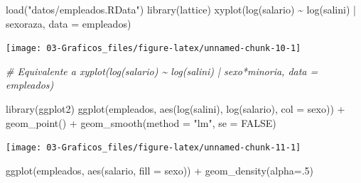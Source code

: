 \documentclass[
]{book}
\newenvironment{Shaded}{\begin{snugshade}}{\end{snugshade}}
\newcommand{\AttributeTok}[1]{\textcolor[rgb]{0.77,0.63,0.00}{#1}}
\newcommand{\CommentTok}[1]{\textcolor[rgb]{0.56,0.35,0.01}{\textit{#1}}}
\newcommand{\ConstantTok}[1]{\textcolor[rgb]{0.00,0.00,0.00}{#1}}
\newcommand{\DecValTok}[1]{\textcolor[rgb]{0.00,0.00,0.81}{#1}}
\newcommand{\FunctionTok}[1]{\textcolor[rgb]{0.00,0.00,0.00}{#1}}
\newcommand{\NormalTok}[1]{#1}
\newcommand{\SpecialCharTok}[1]{\textcolor[rgb]{0.00,0.00,0.00}{#1}}
\newcommand{\StringTok}[1]{\textcolor[rgb]{0.31,0.60,0.02}{#1}}
\theoremstyle{break}
\theoremstyle{nonumberplain}
\begin{document}
\begin{Shaded}
\begin{Highlighting}[]
\FunctionTok{load}\NormalTok{(}\StringTok{"datos/empleados.RData"}\NormalTok{)}
\FunctionTok{library}\NormalTok{(lattice)}
\FunctionTok{xyplot}\NormalTok{(}\FunctionTok{log}\NormalTok{(salario) }\SpecialCharTok{\textasciitilde{}} \FunctionTok{log}\NormalTok{(salini) }\SpecialCharTok{|}\NormalTok{ sexoraza, }\AttributeTok{data =}\NormalTok{ empleados)}
\end{Highlighting}
\end{Shaded}

\begin{center}\texttt{[image: 03-Graficos\_files/figure-latex/unnamed-chunk-10-1]} \end{center}

\begin{Shaded}
\begin{Highlighting}[]
\CommentTok{\# Equivalente a xyplot(log(salario) \textasciitilde{} log(salini) | sexo*minoria, data = empleados)}
\end{Highlighting}
\end{Shaded}

\begin{Shaded}
\begin{Highlighting}[]
\FunctionTok{library}\NormalTok{(ggplot2)}
\FunctionTok{ggplot}\NormalTok{(empleados, }\FunctionTok{aes}\NormalTok{(}\FunctionTok{log}\NormalTok{(salini), }\FunctionTok{log}\NormalTok{(salario), }\AttributeTok{col =}\NormalTok{ sexo)) }\SpecialCharTok{+}
  \FunctionTok{geom\_point}\NormalTok{() }\SpecialCharTok{+}
  \FunctionTok{geom\_smooth}\NormalTok{(}\AttributeTok{method =} \StringTok{"lm"}\NormalTok{, }\AttributeTok{se =} \ConstantTok{FALSE}\NormalTok{)}
\end{Highlighting}
\end{Shaded}

\begin{center}\texttt{[image: 03-Graficos\_files/figure-latex/unnamed-chunk-11-1]} \end{center}

\begin{Shaded}
\begin{Highlighting}[]
\FunctionTok{ggplot}\NormalTok{(empleados, }\FunctionTok{aes}\NormalTok{(salario, }\AttributeTok{fill =}\NormalTok{ sexo)) }\SpecialCharTok{+}
  \FunctionTok{geom\_density}\NormalTok{(}\AttributeTok{alpha=}\NormalTok{.}\DecValTok{5}\NormalTok{)}
\end{Highlighting}
\end{Shaded}
\end{document}
